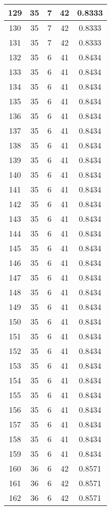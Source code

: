 \documentclass[letterpaper, 12pt]{article}
\begin{document}
\begin{longtable}{|c|c|c|c|c|}
\hline
129 & 35 & 7 & 42 & 0.8333 \\
\hline
130 & 35 & 7 & 42 & 0.8333 \\
\hline
131 & 35 & 7 & 42 & 0.8333 \\
\hline
132 & 35 & 6 & 41 & 0.8434 \\
\hline
133 & 35 & 6 & 41 & 0.8434 \\
\hline
134 & 35 & 6 & 41 & 0.8434 \\
\hline
135 & 35 & 6 & 41 & 0.8434 \\
\hline
136 & 35 & 6 & 41 & 0.8434 \\
\hline
137 & 35 & 6 & 41 & 0.8434 \\
\hline
138 & 35 & 6 & 41 & 0.8434 \\
\hline
139 & 35 & 6 & 41 & 0.8434 \\
\hline
140 & 35 & 6 & 41 & 0.8434 \\
\hline
141 & 35 & 6 & 41 & 0.8434 \\
\hline
142 & 35 & 6 & 41 & 0.8434 \\
\hline
143 & 35 & 6 & 41 & 0.8434 \\
\hline
144 & 35 & 6 & 41 & 0.8434 \\
\hline
145 & 35 & 6 & 41 & 0.8434 \\
\hline
146 & 35 & 6 & 41 & 0.8434 \\
\hline
147 & 35 & 6 & 41 & 0.8434 \\
\hline
148 & 35 & 6 & 41 & 0.8434 \\
\hline
149 & 35 & 6 & 41 & 0.8434 \\
\hline
150 & 35 & 6 & 41 & 0.8434 \\
\hline
151 & 35 & 6 & 41 & 0.8434 \\
\hline
152 & 35 & 6 & 41 & 0.8434 \\
\hline
153 & 35 & 6 & 41 & 0.8434 \\
\hline
154 & 35 & 6 & 41 & 0.8434 \\
\hline
155 & 35 & 6 & 41 & 0.8434 \\
\hline
156 & 35 & 6 & 41 & 0.8434 \\
\hline
157 & 35 & 6 & 41 & 0.8434 \\
\hline
158 & 35 & 6 & 41 & 0.8434 \\
\hline
159 & 35 & 6 & 41 & 0.8434 \\
\hline
160 & 36 & 6 & 42 & 0.8571 \\
\hline
161 & 36 & 6 & 42 & 0.8571 \\
\hline
162 & 36 & 6 & 42 & 0.8571 \\

\end{longtable}
\end{document}
